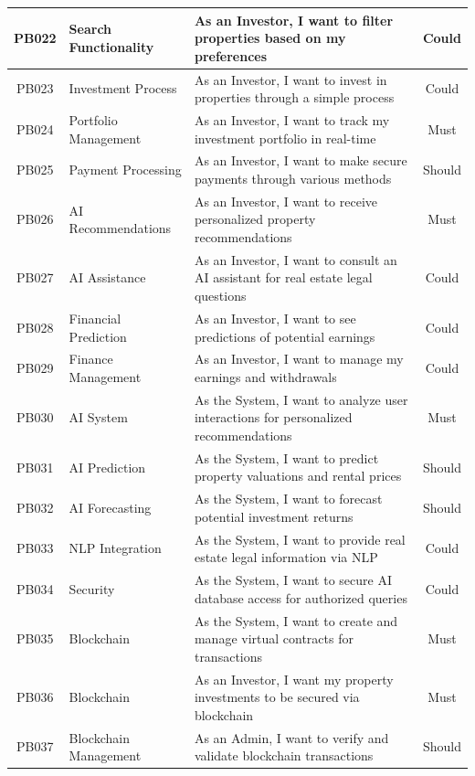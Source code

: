 \begin{longtable}{|c|l|p{8cm}|c|}
    \hline
    PB022 & Search Functionality & As an Investor, I want to filter properties based on my preferences & Could \\
    \hline
    PB023 & Investment Process & As an Investor, I want to invest in properties through a simple process & Could \\
    \hline
    PB024 & Portfolio Management & As an Investor, I want to track my investment portfolio in real-time & Must \\
    \hline
    PB025 & Payment Processing & As an Investor, I want to make secure payments through various methods & Should \\
    \hline
    PB026 & AI Recommendations & As an Investor, I want to receive personalized property recommendations & Must \\
    \hline
    PB027 & AI Assistance & As an Investor, I want to consult an AI assistant for real estate legal questions & Could \\
    \hline
    PB028 & Financial Prediction & As an Investor, I want to see predictions of potential earnings & Could \\
    \hline
    PB029 & Finance Management & As an Investor, I want to manage my earnings and withdrawals & Could \\
    \hline
    PB030 & AI System & As the System, I want to analyze user interactions for personalized recommendations & Must \\
    \hline
    PB031 & AI Prediction & As the System, I want to predict property valuations and rental prices & Should \\
    \hline
    PB032 & AI Forecasting & As the System, I want to forecast potential investment returns & Should \\
    \hline
    PB033 & NLP Integration & As the System, I want to provide real estate legal information via NLP & Could \\
    \hline
    PB034 & Security & As the System, I want to secure AI database access for authorized queries & Could \\
    \hline
    PB035 & Blockchain & As the System, I want to create and manage virtual contracts for transactions & Must \\
    \hline
    PB036 & Blockchain & As an Investor, I want my property investments to be secured via blockchain & Must \\
    \hline
    PB037 & Blockchain Management & As an Admin, I want to verify and validate blockchain transactions & Should \\

\end{longtable}
